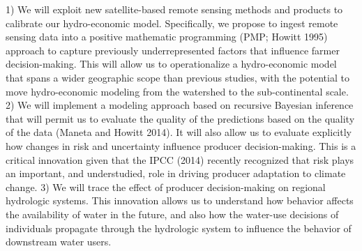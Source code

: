 \documentclass[review]{elsarticle}
\begin{document}
1) We will exploit new satellite-based remote sensing methods and products to calibrate our hydro-economic model. Specifically, we propose to ingest remote sensing data into a positive mathematic programming (PMP; Howitt 1995) approach to capture previously underrepresented factors that influence farmer decision-making. This will allow us to operationalize a hydro-economic model that spans a wider geographic scope than previous studies, with the potential to move hydro-economic modeling from the watershed to the sub-continental scale. 
2) We will implement a modeling approach based on recursive Bayesian inference that will permit us to evaluate the quality of the predictions based on the quality of the data (Maneta and Howitt 2014). It will also allow us to evaluate explicitly how changes in risk and uncertainty influence producer decision-making. This is a critical innovation given that the IPCC (2014) recently recognized that risk plays an important, and understudied, role in driving producer adaptation to climate change. 
3) We will trace the effect of producer decision-making on regional hydrologic systems. This innovation allows us to understand how behavior affects the availability of water in the future, and also how the water-use decisions of individuals propagate through the hydrologic system to influence the behavior of downstream water users. 
\end{document}
